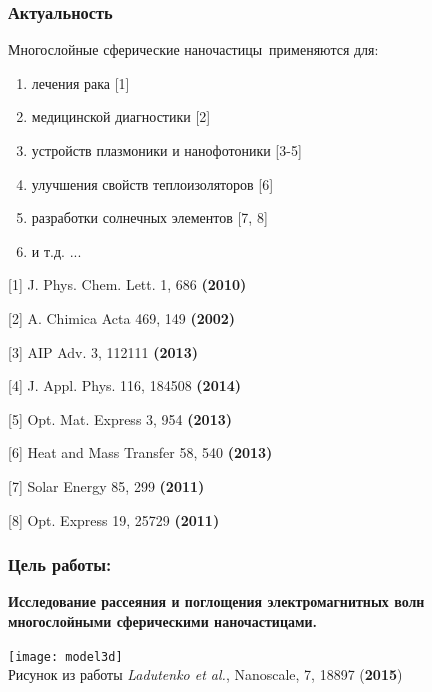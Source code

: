 \documentclass[14pt]{beamer}
\title{\small{\thesisTitle}}
\author{\small{%
\emph{Выступающий:}~\thesisAuthorShort\\%
\emph{Руководитель:}~\supervisorRegaliaShort~\supervisorFioShort}\\%
\vspace{30pt}%
\thesisOrganization%
\vspace{20pt}%
}
\date{\small{\thesisCity, \thesisYear}}
\begin{document}
\maketitle

\begin{frame}
  \frametitle{Актуальность}
  \begin{block}{\normalsize Многослойные сферические наночастицы\
      применяются для:}
    \begin{enumerate}
    \item \small лечения рака [1]
    \item медицинской диагностики [2]
    \item устройств плазмоники и нанофотоники [3-5]
    \item улучшения свойств теплоизоляторов [6]
    \item разработки солнечных элементов [7, 8]
      \item и т.д. ... 
    \end{enumerate}
  \end{block}
  \begin{minipage}{0.49\linewidth}
    \scriptsize
 [1] J. Phys. Chem. Lett. 1, 686 \textbf{(2010)}

 [2] A. Chimica Acta 469, 149 \textbf{(2002)}

 [3] AIP Adv. 3, 112111 \textbf{(2013)}

 [4] J. Appl. Phys. 116, 184508 \textbf{(2014)}

  \end{minipage}
  \begin{minipage}{0.49\linewidth}
\scriptsize
 [5] Opt. Mat. Express 3, 954 \textbf{(2013)}

 [6] Heat and Mass Transfer 58, 540 \textbf{(2013)}

 [7] Solar Energy 85, 299 \textbf{(2011)}

 [8] Opt. Express 19, 25729 \textbf{(2011)}
  \end{minipage}
\end{frame}

\begin{frame}
  \frametitle{Цель работы:}
  \begin{center}
\textbf{    Исследование рассеяния и поглощения электромагнитных волн
    многослойными сферическими наночастицами.
}  \end{center}
  \begin{center}
    \texttt{[image: model3d]}    \\
  \scriptsize Рисунок из работы \textit{Ladutenko et al.}, Nanoscale, 7, 18897 (\textbf{2015})
\end{center}

\end{frame}
\end{document}
